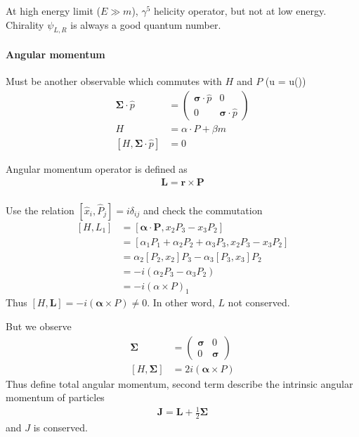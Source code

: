At high energy limit ($E \gg m$), $\gamma^5$ helicity operator, but not at low energy. Chirality $\psi_{L,R}$ is always a good quantum number.


\paragraph{Angular momentum}
Must be another observable which commutes with $H$ and $P$ (u = u())
\begin{align}
   \pmb{\Sigma} \cdot \hat{p} &= \begin{pmatrix} \pmb{\sigma} \cdot \hat{p} & 0 \\ 0 &\pmb{\sigma} \cdot \hat{p} \end{pmatrix} \\
   H &= \alpha \cdot P + \beta m \\
   \left[ H, \pmb{\Sigma} \cdot \hat{p} \right] &= 0
\end{align}

Angular momentum operator is defined as 
\begin{align}
   \pmb{L} = \pmb{r} \times \pmb{P} \\
\end{align}

Use the relation $\left[ \hat{x}_i, \hat{P}_j \right] = i \delta_{ij}$ and check the commutation
\begin{align*}
   \left[ H, L_1 \right] &= \left[ \pmb{\alpha} \cdot \pmb{P}, x_2 P_3 - x_3 P_2 \right] \\
                         &= \left[ \alpha_1 P_1 + \alpha_2 P_2 + \alpha_3 P_3, x_2 P_3  - x_3 P_2 \right] \\
                         &= \alpha_2 \left[ P_2, x_2 \right] P_3 - \alpha_3 \left[ P_3, x_3 \right] P_2  \\
                         &= -i \left( \alpha_2 P_3 - \alpha_3 P_2 \right)\\
                         &= -i (\alpha \times P)_1
\end{align*}
Thus $ \left[ H, \pmb{L} \right] = -i (\pmb{\alpha} \times P) \neq 0$. In other word, $L$ not conserved.

But we observe
\begin{align}
   \pmb{\Sigma} &= \begin{pmatrix} \pmb{\sigma} & 0 \\ 0 & \pmb{\sigma}\end{pmatrix} \\
   \left[ H, \pmb{\Sigma} \right] &= 2i(\pmb{\alpha} \times P)
\end{align}
Thus define total angular momentum, second term describe the intrinsic angular momentum of particles
\begin{align}
   \pmb{J} = \pmb{L} + \frac{1}{2} \pmb{\Sigma}
\end{align}
and $J$ is conserved.

